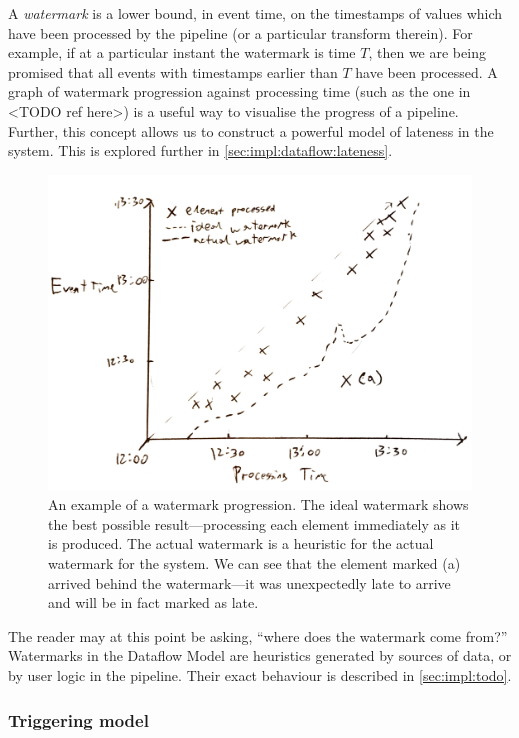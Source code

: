 A \emph{watermark} is a lower bound, in event time, on the timestamps of values which have been processed by the pipeline (or a particular transform therein).
For example, if at a particular instant the watermark is time $T$, then we are being promised that all events with timestamps earlier than $T$ have been processed.
A graph of watermark progression against processing time (such as the one in <TODO ref here>) is a useful way to visualise the progress of a pipeline.
Further, this concept allows us to construct a powerful model of lateness in the system.
This is explored further in \cref{sec:impl:dataflow:lateness}.

\begin{figure}[h]
	\includegraphics[width=\textwidth]{images/temp/watermark-progression-example}
	\caption{An example of a watermark progression. The ideal watermark shows the best possible result---processing each element immediately as it is produced. The actual watermark is a heuristic for the actual watermark for the system. We can see that the element marked (a) arrived behind the watermark---it was unexpectedly late to arrive and will be in fact marked as late.}
\end{figure}

The reader may at this point be asking, ``where does the watermark come from?''
Watermarks in the Dataflow Model are heuristics generated by sources of data, or by user logic in the pipeline.
Their exact behaviour is described in \cref{sec:impl:todo}.

\subsubsection{Triggering model}

